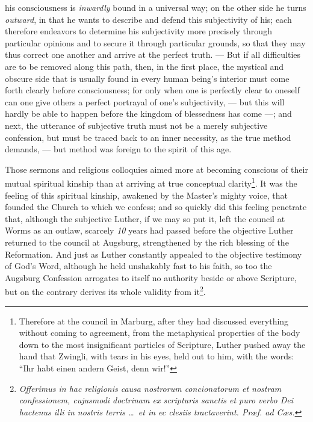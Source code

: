 \documentclass[12pt]{book}
\newcommand{\opage}[1]{\marginnote{\footnotesize\textit{[#1]}}}
\begin{document}
his consciousness is \emph{inwardly} bound in a universal way; on the other
side he turns \emph{outward}, in that he wants to describe and defend this
subjectivity of his; each therefore endeavors to determine his subjectivity
more precisely through particular opinions and to secure it through
particular grounds, so that they may thus correct one another and arrive at
the perfect truth. --- But if all difficulties are to be removed along this
path, then, in the first place, the mystical and obscure side that is usually
found in every human being's interior must come forth clearly before
consciousness; for only when one is perfectly clear to oneself can one give
others a perfect portrayal of one's subjectivity, --- but this will hardly be
able to happen before the kingdom of blessedness has come ---; and next, the
utterance of subjective truth must not be a merely subjective confession, but
must be traced back to an inner necessity, as the true method demands, ---
but method was foreign to the spirit of this age.

Those sermons and religious colloquies aimed more at becoming conscious of
their mutual spiritual kinship than at arriving at true conceptual
clarity\footnote{Therefore at the council in Marburg, after they had
discussed everything without coming to agreement, from the metaphysical
properties of the body down to the most insignificant particles of
Scripture, Luther pushed away the hand that Zwingli, with tears in his eyes,
held out to him, with the words: ``Ihr habt einen andern Geist, denn
wir!''}. It was the feeling of this spiritual kinship, awakened by the
Master's mighty voice, that
\opage{71}\setcounter{footnote}{0}%
founded the Church to which we confess; and so quickly did this feeling
penetrate that, although the subjective Luther, if we may so put it, left the
council at Worms as an outlaw, scarcely \textit{10} years had passed before
the objective Luther returned to the council at Augsburg, strengthened by the
rich blessing of the Reformation. And just as Luther constantly appealed to
the objective testimony of God's Word, although he held unshakably fast to
his faith, so too the Augsburg Confession arrogates to itself no authority
beside or above Scripture, but on the contrary derives its whole validity
from it\footnote{\textit{Offerimus in hac religionis causa
nostrorum concionatorum et nostram confessionem, cujusmodi doctrinam ex
scripturis sanctis et puro verbo Dei hactenus illi in nostris terris
\ldots\ et in ec clesiis tractaverint. Præf. ad Cæs.}}.
\end{document}

